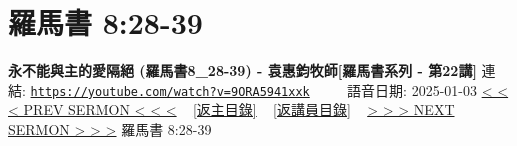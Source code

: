 \documentclass{book}
\begin{document}
\section{羅馬書 8:28-39}
\label{sec:9ORA5941xxk}
\textbf{永不能與主的愛隔絕 (羅馬書8\_28-39) - 袁惠鈞牧師[羅馬書系列 - 第22講]}
\newline
\newline
連結: \href{https://youtube.com/watch?v=9ORA5941xxk}{\texttt{https://youtube.com/watch?v=9ORA5941xxk}} ~~~~ 語音日期: 2025-01-03
\newline
\newline
\hyperref[sec:KIOzsSOi_wU]{< < < PREV SERMON < < <}
~
\hyperlink{toc}{[返主目錄]}
~
\hyperref[ch:preacher12]{[返講員目錄]}
~
\hyperref[sec:w_ajWsBZ9eQ]{> > > NEXT SERMON > > >}
\newline
\newline
羅馬書 8:28-39
\newline
\end{document}
